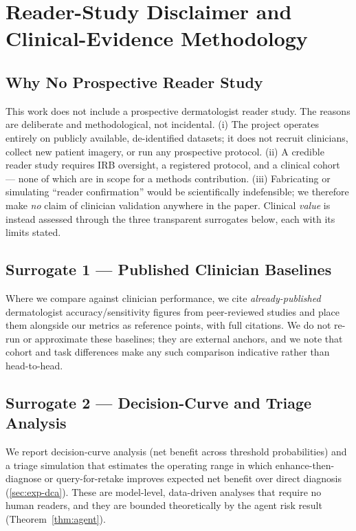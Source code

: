 
\section{Reader-Study Disclaimer and Clinical-Evidence Methodology}\label{app:a23}

\subsection{Why No Prospective Reader Study}\label{app:a23-why}
This work does not include a prospective dermatologist reader study. The reasons are deliberate and
methodological, not incidental. (i) The project operates entirely on publicly available, de-identified
datasets; it does not recruit clinicians, collect new patient imagery, or run any prospective
protocol. (ii) A credible reader study requires IRB oversight, a registered protocol, and a clinical
cohort --- none of which are in scope for a methods contribution. (iii) Fabricating or simulating
``reader confirmation'' would be scientifically indefensible; we therefore make \emph{no} claim of
clinician validation anywhere in the paper. Clinical \emph{value} is instead assessed through the
three transparent surrogates below, each with its limits stated.

\subsection{Surrogate 1 --- Published Clinician Baselines}\label{app:a23-baselines}
Where we compare against clinician performance, we cite \emph{already-published} dermatologist
accuracy/sensitivity figures from peer-reviewed studies and place them alongside our metrics as
reference points, with full citations. We do not re-run or approximate these baselines; they are
external anchors, and we note that cohort and task differences make any such comparison indicative
rather than head-to-head.

\subsection{Surrogate 2 --- Decision-Curve and Triage Analysis}\label{app:a23-dca}
We report decision-curve analysis (net benefit across threshold probabilities) and a triage
simulation that estimates the operating range in which enhance-then-diagnose or query-for-retake
improves expected net benefit over direct diagnosis (\cref{sec:exp-dca}). These are model-level,
data-driven analyses that require no human readers, and they are bounded theoretically by the agent
risk result (Theorem~\ref{thm:agent}).

